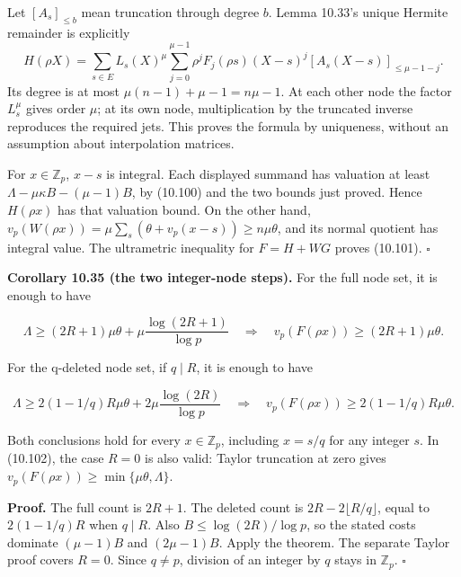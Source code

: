 \documentclass[
  11pt,
  a4paper,
]{article}
\begin{document}
Let \([A_s]_{\le b}\) mean truncation through degree \(b\). Lemma
10.33's unique Hermite remainder is explicitly \[
H(\rho X)=\sum_{s\in E}L_s(X)^\mu
\sum_{j=0}^{\mu-1}\rho^j F_j(\rho s)(X-s)^j
[A_s(X-s)]_{\le\mu-1-j}.
\] Its degree is at most \(\mu(n-1)+\mu-1=n\mu-1\). At each other node
the factor \(L_s^\mu\) gives order \(\mu\); at its own node,
multiplication by the truncated inverse reproduces the required jets.
This proves the formula by uniqueness, without an assumption about
interpolation matrices.

For \(x\in\mathbb Z_p\), \(x-s\) is integral. Each displayed summand has
valuation at least \(\Lambda-\mu\kappa B-(\mu-1)B\), by (10.100) and the
two bounds just proved. Hence \(H(\rho x)\) has that valuation bound. On
the other hand,
\(v_p(W(\rho x))=\mu\sum_s(\theta+v_p(x-s))\ge n\mu\theta\), and its
normal quotient has integral value. The ultrametric inequality for
\(F=H+WG\) proves (10.101). \(\square\)

\textbf{Corollary 10.35 (the two integer-node steps).} For the full node
set, it is enough to have

\[
\Lambda\ge(2R+1)\mu\theta
+\mu\frac{\log(2R+1)}{\log p}
\quad\Longrightarrow\quad
v_p(F(\rho x))\ge(2R+1)\mu\theta.
\tag{10.102}
\]

For the q-deleted node set, if \(q\mid R\), it is enough to have

\[
\Lambda\ge2(1-1/q)R\mu\theta
+2\mu\frac{\log(2R)}{\log p}
\quad\Longrightarrow\quad
v_p(F(\rho x))\ge2(1-1/q)R\mu\theta.
\tag{10.103}
\]

Both conclusions hold for every \(x\in\mathbb Z_p\), including \(x=s/q\)
for any integer \(s\). In (10.102), the case \(R=0\) is also valid:
Taylor truncation at zero gives
\(v_p(F(\rho x))\ge\min\{\mu\theta,\Lambda\}\).

\textbf{Proof.} The full count is \(2R+1\). The deleted count is
\(2R-2\lfloor R/q\rfloor\), equal to \(2(1-1/q)R\) when \(q\mid R\).
Also \(B\le\log(2R)/\log p\), so the stated costs dominate \((\mu-1)B\)
and \((2\mu-1)B\). Apply the theorem. The separate Taylor proof covers
\(R=0\). Since \(q\ne p\), division of an integer by \(q\) stays in
\(\mathbb Z_p\). \(\square\)
\end{document}
